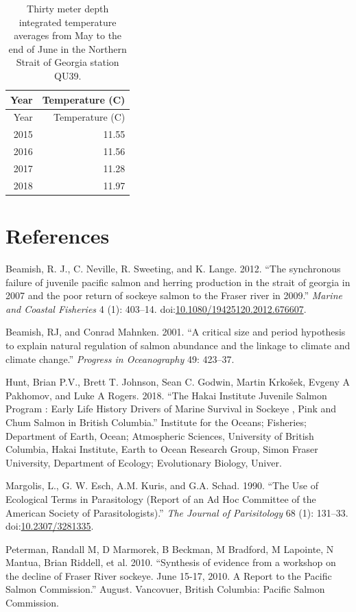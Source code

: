\documentclass[fleqn,10pt]{wlpeerj} %
\begin{document}
\begin{longtable}[]{@{}rr@{}}
\caption{\label{tab:ssttable} Thirty meter depth integrated temperature
averages from May to the end of June in the Northern Strait of Georgia
station QU39.}\tabularnewline
\toprule
Year & Temperature (C)\tabularnewline
\midrule
\endfirsthead
\toprule
Year & Temperature (C)\tabularnewline
\midrule
\endhead
2015 & 11.55\tabularnewline
2016 & 11.56\tabularnewline
2017 & 11.28\tabularnewline
2018 & 11.97\tabularnewline
\bottomrule
\end{longtable}

\section*{References}\label{references}

\hypertarget{refs}{}
\hypertarget{ref-Beamish2012}{}
Beamish, R. J., C. Neville, R. Sweeting, and K. Lange. 2012. ``The
synchronous failure of juvenile pacific salmon and herring production in
the strait of georgia in 2007 and the poor return of sockeye salmon to
the Fraser river in 2009.'' \emph{Marine and Coastal Fisheries} 4 (1):
403--14.
doi:\href{https://doi.org/10.1080/19425120.2012.676607}{10.1080/19425120.2012.676607}.

\hypertarget{ref-Beamish2001}{}
Beamish, RJ, and Conrad Mahnken. 2001. ``A critical size and period
hypothesis to explain natural regulation of salmon abundance and the
linkage to climate and climate change.'' \emph{Progress in Oceanography}
49: 423--37.

\hypertarget{ref-Hunt2018}{}
Hunt, Brian P.V., Brett T. Johnson, Sean C. Godwin, Martin Krkošek,
Evgeny A Pakhomov, and Luke A Rogers. 2018. ``The Hakai Institute
Juvenile Salmon Program : Early Life History Drivers of Marine Survival
in Sockeye , Pink and Chum Salmon in British Columbia.'' Institute for
the Oceans; Fisheries; Department of Earth, Ocean; Atmospheric Sciences,
University of British Columbia, Hakai Institute, Earth to Ocean Research
Group, Simon Fraser University, Department of Ecology; Evolutionary
Biology, Univer.

\hypertarget{ref-Margolis1990}{}
Margolis, L., G. W. Esch, A.M. Kuris, and G.A. Schad. 1990. ``The Use of
Ecological Terms in Parasitology (Report of an Ad Hoc Committee of the
American Society of Parasitologists).'' \emph{The Journal of
Parisitology} 68 (1): 131--33.
doi:\href{https://doi.org/10.2307/3281335}{10.2307/3281335}.

\hypertarget{ref-Peterman2010}{}
Peterman, Randall M, D Marmorek, B Beckman, M Bradford, M Lapointe, N
Mantua, Brian Riddell, et al. 2010. ``Synthesis of evidence from a
workshop on the decline of Fraser River sockeye. June 15-17, 2010. A
Report to the Pacific Salmon Commission.'' August. Vancovuer, British
Columbia: Pacific Salmon Commission.
\end{document}
